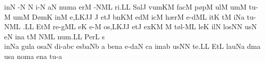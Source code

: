 \spatium
\sgn {}in\punctum N\egn
\spatium
{}-\punctum N\egn
\custos N\lineaproxima
i-\punctum N\egn
\sgn {}a{}\punctum N\egn
\spatium
\sgn num\punctum a\egn
\sgn {}er\punctum M\egn
\sgn {}{\a}-\climacus NML\egn
\sgn ri.\punctum L\augmentum L\egn
\spatium
\divisiofinalis
\spatium
\sgn Sal\punctum J\egn
\sgn vum\pes KM\egn
\spatium
\sgn fac\punctum M\egn
\spatium
\sgn p{\o}p\punctum M\egn
\sgn {}ul\punctum M\egn
\sgn {}um\punctum M\egn
\spatium
\sgn tu-\punctum M\egn
\sgn {}um\punctum M\egn
\spatium
\sgn D{\o}m\punctum K\egn
\sgn {}in\punctum M\egn
\sgn {}e,\climacus LKJ\augmentum J\egn
\spatium
\divisiominor
\spatium\custos J\lineaproxima
\sgn {}et\punctum J\egn
\spatium
\sgn b{\e}n\pes KM\egn
\sgn {}ed\punctum M\egn
\sgn {}ic\punctum M\egn
\spatium
\sgn h{\ae}r\punctum M\egn
\sgn {}e{-d}\clivis ML\egn
\sgn {}it\punctum K\egn
\sgn {}{\a}t\punctum M\egn
\sgn {}i{}\pes Na\egn
\spatium
\sgn tu-\climacus NML\egn
\sgn {}{\ae}.\punctum L\augmentum L\egn
\spatium
\divisiofinalis
\spatium
\sgn {}Et\punctum M\egn
\spatium
\sgn re{-g}\clivis ML\egn
\sgn {}e{}\punctum K\egn
\spatium
\sgn {}e-\punctum M\egn
\sgn {}o{s,}\climacus LKJ\augmentum J\egn
\spatium
\divisiominor
\spatium
\sgn {}et\punctum J\egn
\spatium
\sgn {}ex\pes KM\egn
\custos M\lineaproxima
\sgn t{\o}{l-}\clivis ML\egn
\sgn le{}\punctum K\egn
\spatium
\sgn {}il\punctum N\egn
\sgn los\punctum N\augmentum N\egn
\spatium
\divisiominima
\spatium
\sgn {}us\punctum N\egn
{}e{}\punctum N\egn
\spatium
\sgn {}in\punctum a\egn
\spatium
\sgn {}{\ae}t\punctum M\egn
{}\climacus NML\egn
\sgn nu{m.}\punctum L\augmentum L\egn
\spatium
\divisiofinalis
\spatium
\sgn Per\punctum L\egn
\spatium
\sgn s{\\i}n\pes Na\egn
\sgn gul\punctum a\egn
\sgn {}os\clivis aN\egn
\spatium
\sgn di-\quilismascandicus abc\egn
\sgn {}es\clivis ba\augmentumduplex Nb\egn
\spatium
\divisiominor
\spatium
\custos a\lineaproxima
\sgn ben\punctum a\egn
\sgn {}e{-d}\clivis aN\egn
\sgn {}{\\i}c\punctum a\egn
\sgn {}im\pes ab\egn
\sgn {}us\punctum N\augmentum N\egn
\spatium
\sgn te.\punctum L\augmentum L\egn
\spatium
\divisiofinalis
\spatium
\sgn {}Et\punctum L\egn
\spatium
\sgn lau\epiphonus Na\egn
\sgn d{\a}m\punctum a\egn
\sgn {}us\punctum a\egn
\spatium
\sgn nom\punctum a\egn
\sgn {}en\punctum a\egn
\spatium
\sgn tu-\punctum a\egn
